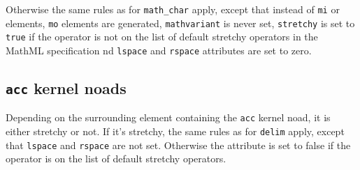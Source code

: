 \documentclass{article}
\begin{document}
Otherwise the same rules as for \texttt{math_char} apply,
except that instead of \texttt{mi} or  elements,
\texttt{mo} elements are generated,
\texttt{mathvariant} is never set,
\texttt{stretchy} is set to \texttt{true} if the operator is not on the list of default stretchy operators in the MathML specification 
nd \texttt{lspace} and \texttt{rspace} attributes are set to zero.

\subsection{\texttt{acc} kernel noads}
Depending on the surrounding element containing the \texttt{acc} kernel noad, it is either stretchy or not.
If it's stretchy, the same rules as for \texttt{delim} apply, except that \texttt{lspace} and \texttt{rspace} are not set.
Otherwise the  attribute is set to false if the operator is on the list of default stretchy operators.
\end{document}
